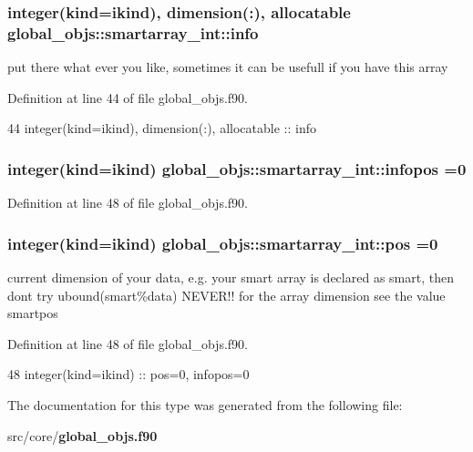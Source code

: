 \subsubsection[{info}]{\setlength{\rightskip}{0pt plus 5cm}integer(kind=ikind), dimension(\+:), allocatable global\+\_\+objs\+::smartarray\+\_\+int\+::info}\label{structglobal__objs_1_1smartarray__int_a0d4c475d2de3a084dc9766df0b99ad76}


put there what ever you like, sometimes it can be usefull if you have this array 



Definition at line 44 of file global\+\_\+objs.\+f90.


\begin{DoxyCode}
44     \textcolor{keywordtype}{integer(kind=ikind)}, \textcolor{keywordtype}{dimension(:)}, \textcolor{keywordtype}{allocatable} :: info
\end{DoxyCode}
\subsubsection[{infopos}]{\setlength{\rightskip}{0pt plus 5cm}integer(kind=ikind) global\+\_\+objs\+::smartarray\+\_\+int\+::infopos =0}\label{structglobal__objs_1_1smartarray__int_aa65bac89284c97de70faad2b7a990754}


Definition at line 48 of file global\+\_\+objs.\+f90.

\subsubsection[{pos}]{\setlength{\rightskip}{0pt plus 5cm}integer(kind=ikind) global\+\_\+objs\+::smartarray\+\_\+int\+::pos =0}\label{structglobal__objs_1_1smartarray__int_a6282982fe86310331c9d8c0027d9374f}


current dimension of your data, e.\+g. your smart array is declared as smart, then don\textquotesingle{}t try ubound(smart\%data) N\+E\+V\+E\+R!! for the array dimension see the value smartpos 



Definition at line 48 of file global\+\_\+objs.\+f90.


\begin{DoxyCode}
48     \textcolor{keywordtype}{integer(kind=ikind)} :: pos=0, infopos=0
\end{DoxyCode}


The documentation for this type was generated from the following file\+:\begin{DoxyCompactItemize}
\item 
src/core/{\bf global\+\_\+objs.\+f90}\end{DoxyCompactItemize}

